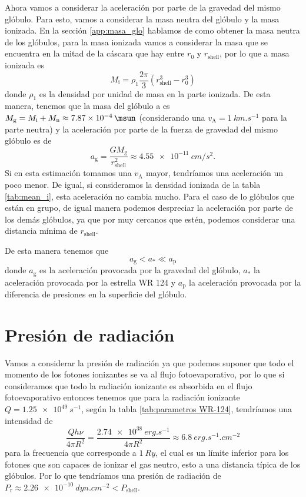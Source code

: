 \documentclass{book}
\begin{document}
Ahora vamos a considerar la aceleración por parte de la gravedad del
mismo glóbulo. Para esto, vamos a considerar la masa neutra del
glóbulo y la masa ionizada. En la sección \ref{app:masa_glo} hablamos
de como obtener la masa neutra de los glóbulos, para la masa ionizada
vamos a considerar la masa que se encuentra en la mitad de la cáscara
que hay entre $r_0$ y $r_\mathrm{shell}$, por lo que a masa ionizada
es
\begin{equation}
    M_\mathrm{i} = \rho_1 \frac{2\pi}{3}(r_\mathrm{shell}^3-r_0^3)
\end{equation}
donde $\rho_1$ es la densidad por unidad de masa en la parte ionizada. De
esta manera, tenemos que la masa del glóbulo a es
$M_\mathrm{g} = M_\mathrm{i} + M_\mathrm{n} \approx \SI{7.87e-4}{\msun}$
(considerando una $v_\mathrm{A}=\SI{1}{km.s^{-1}}$ para la parte
neutra) y la aceleración por parte de la fuerza de gravedad del mismo
glóbulo es de
\begin{equation}
a_\mathrm{g}=\frac{G M_\mathrm{g}}{r_\mathrm{shell}^2}\approx \SI{4.55e-11}{cm/s^2}.
\end{equation}
Si en esta estimación tomamos una $v_\mathrm{A}$ mayor, tendríamos una
aceleración un poco menor. De igual, si consideramos la densidad
ionizada de la tabla \ref{tab:mean_i}, esta aceleración no cambia
mucho. Para el caso de lo glóbulos que están en grupo, de igual manera
podemos despreciar la aceleración por parte de los demás glóbulos, ya
que por muy cercanos que estén, podemos considerar una distancia
mínima de $r_\mathrm{shell}$.

De esta manera tenemos que
\begin{equation}
a_\mathrm{g}<a_*\ll a_\mathrm{p}
\end{equation}
donde $a_\mathrm{g}$ es la aceleración provocada por la gravedad del
glóbulo, $a_*$ la aceleración provocada por la estrella WR 124 y
$a_\mathrm{p}$ la aceleración provocada por la diferencia de presiones
en la superficie del glóbulo.

\section{Presión de radiación}

Vamos a considerar la presión de radiación ya que podemos suponer que
todo el momento de los fotones ionizantes se va al flujo
fotoevaporativo, por lo que si consideramos que todo la radiación
ionizante es absorbida en el flujo fotoevaporativo entonces tenemos
que para la radiación ionizante $Q = \SI{1.25e49}{s^{-1}}$, según la
tabla \ref{tab:parametros WR-124}, tendríamos una intensidad de
\begin{equation}
\frac{Q h\nu}{4\pi R^2} = \frac{\SI{2.74e38}{erg.s^{-1}}}{4\pi R^2} \approx \SI{6.8}{erg.s^{-1}.cm^{-2}}
\end{equation}
para la frecuencia que corresponde a $\SI{1}{Ry}$, el cual es un
límite inferior para los fotones que son capaces de ionizar el gas
neutro, esto a una distancia típica de los glóbulos. Por lo que
tendríamos una presión de radiación de
$P_\mathrm{r}\approx \SI{2.26e-10}{dyn.cm^{-2}} < P_\mathrm{shell}$.
\end{document}
